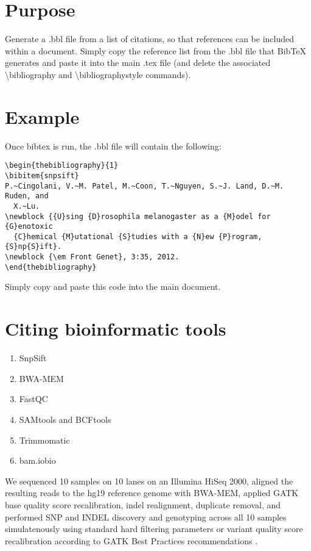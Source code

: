 \documentclass[a4paper, 10pt]{article}
\begin{document}


\section{Purpose}

Generate a .bbl file from a list of citations, so that references can be included within a document. Simply copy the reference list from the .bbl file that BibTeX generates and paste it into the main .tex file (and delete the associated \textbackslash{}bibliography and \textbackslash{}bibliographystyle commands).

\section{Example}

Once bibtex is run, the .bbl file will contain the following:

\begin{lstlisting}
\begin{thebibliography}{1}
\bibitem{snpsift}
P.~Cingolani, V.~M. Patel, M.~Coon, T.~Nguyen, S.~J. Land, D.~M. Ruden, and
  X.~Lu.
\newblock {{U}sing {D}rosophila melanogaster as a {M}odel for {G}enotoxic
  {C}hemical {M}utational {S}tudies with a {N}ew {P}rogram, {S}np{S}ift}.
\newblock {\em Front Genet}, 3:35, 2012.
\end{thebibliography}
\end{lstlisting}

Simply copy and paste this code into the main document.

\section{Citing bioinformatic tools}

\begin{enumerate}

   \item SnpSift\cite{snpsift}
   \item BWA-MEM\cite{bwamem}
   \item FastQC\cite{fastqc}
   \item SAMtools and BCFtools\cite{samtools}
   \item Trimmomatic\cite{trimmomatic}
   \item bam.iobio\cite{bamiobio}

\end{enumerate}

We sequenced 10 samples on 10 lanes on an Illumina HiSeq 2000, aligned the resulting reads to the hg19 reference genome with BWA-MEM\cite{bwamem}, applied GATK\cite{pmid20644199} base quality score recalibration, indel realignment, duplicate removal, and performed SNP and INDEL discovery and genotyping across all 10 samples simulatenously using standard hard filtering parameters or variant quality score recalibration according to GATK Best Practices recommendations \cite{pmid21478889, pmid25431634}.
\end{document}
